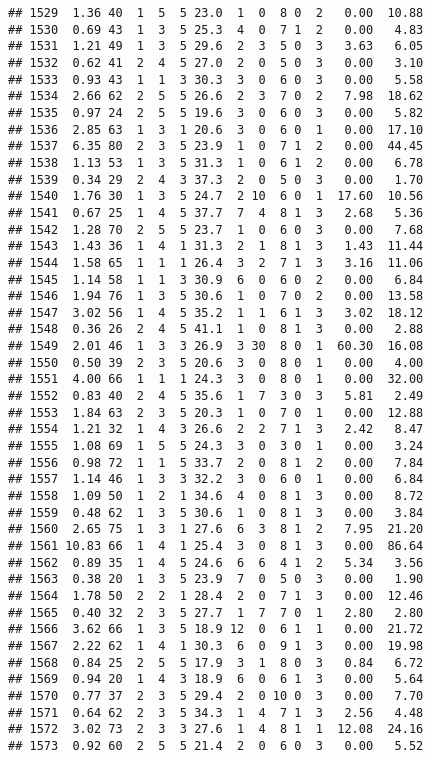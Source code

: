 \documentclass[
]{article}
\begin{document}
\begin{verbatim}
## 1529  1.36 40  1  5  5 23.0  1  0  8 0  2   0.00  10.88
## 1530  0.69 43  1  3  5 25.3  4  0  7 1  2   0.00   4.83
## 1531  1.21 49  1  3  5 29.6  2  3  5 0  3   3.63   6.05
## 1532  0.62 41  2  4  5 27.0  2  0  5 0  3   0.00   3.10
## 1533  0.93 43  1  1  3 30.3  3  0  6 0  3   0.00   5.58
## 1534  2.66 62  2  5  5 26.6  2  3  7 0  2   7.98  18.62
## 1535  0.97 24  2  5  5 19.6  3  0  6 0  3   0.00   5.82
## 1536  2.85 63  1  3  1 20.6  3  0  6 0  1   0.00  17.10
## 1537  6.35 80  2  3  5 23.9  1  0  7 1  2   0.00  44.45
## 1538  1.13 53  1  3  5 31.3  1  0  6 1  2   0.00   6.78
## 1539  0.34 29  2  4  3 37.3  2  0  5 0  3   0.00   1.70
## 1540  1.76 30  1  3  5 24.7  2 10  6 0  1  17.60  10.56
## 1541  0.67 25  1  4  5 37.7  7  4  8 1  3   2.68   5.36
## 1542  1.28 70  2  5  5 23.7  1  0  6 0  3   0.00   7.68
## 1543  1.43 36  1  4  1 31.3  2  1  8 1  3   1.43  11.44
## 1544  1.58 65  1  1  1 26.4  3  2  7 1  3   3.16  11.06
## 1545  1.14 58  1  1  3 30.9  6  0  6 0  2   0.00   6.84
## 1546  1.94 76  1  3  5 30.6  1  0  7 0  2   0.00  13.58
## 1547  3.02 56  1  4  5 35.2  1  1  6 1  3   3.02  18.12
## 1548  0.36 26  2  4  5 41.1  1  0  8 1  3   0.00   2.88
## 1549  2.01 46  1  3  3 26.9  3 30  8 0  1  60.30  16.08
## 1550  0.50 39  2  3  5 20.6  3  0  8 0  1   0.00   4.00
## 1551  4.00 66  1  1  1 24.3  3  0  8 0  1   0.00  32.00
## 1552  0.83 40  2  4  5 35.6  1  7  3 0  3   5.81   2.49
## 1553  1.84 63  2  3  5 20.3  1  0  7 0  1   0.00  12.88
## 1554  1.21 32  1  4  3 26.6  2  2  7 1  3   2.42   8.47
## 1555  1.08 69  1  5  5 24.3  3  0  3 0  1   0.00   3.24
## 1556  0.98 72  1  1  5 33.7  2  0  8 1  2   0.00   7.84
## 1557  1.14 46  1  3  3 32.2  3  0  6 0  1   0.00   6.84
## 1558  1.09 50  1  2  1 34.6  4  0  8 1  3   0.00   8.72
## 1559  0.48 62  1  3  5 30.6  1  0  8 1  3   0.00   3.84
## 1560  2.65 75  1  3  1 27.6  6  3  8 1  2   7.95  21.20
## 1561 10.83 66  1  4  1 25.4  3  0  8 1  3   0.00  86.64
## 1562  0.89 35  1  4  5 24.6  6  6  4 1  2   5.34   3.56
## 1563  0.38 20  1  3  5 23.9  7  0  5 0  3   0.00   1.90
## 1564  1.78 50  2  2  1 28.4  2  0  7 1  3   0.00  12.46
## 1565  0.40 32  2  3  5 27.7  1  7  7 0  1   2.80   2.80
## 1566  3.62 66  1  3  5 18.9 12  0  6 1  1   0.00  21.72
## 1567  2.22 62  1  4  1 30.3  6  0  9 1  3   0.00  19.98
## 1568  0.84 25  2  5  5 17.9  3  1  8 0  3   0.84   6.72
## 1569  0.94 20  1  4  3 18.9  6  0  6 1  3   0.00   5.64
## 1570  0.77 37  2  3  5 29.4  2  0 10 0  3   0.00   7.70
## 1571  0.64 62  2  3  5 34.3  1  4  7 1  3   2.56   4.48
## 1572  3.02 73  2  3  3 27.6  1  4  8 1  1  12.08  24.16
## 1573  0.92 60  2  5  5 21.4  2  0  6 0  3   0.00   5.52

\end{verbatim}
\end{document}
